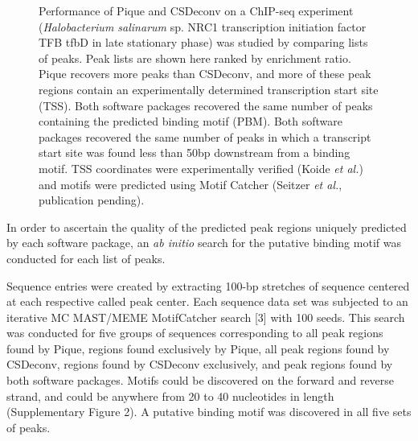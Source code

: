 \documentclass{bioinfo}
\begin{document}
\begin{figure}
  \begin{center}
    {}
  \end{center}
  \caption{Performance of Pique and CSDeconv on a ChIP-seq experiment
    ({\em Halobacterium salinarum} sp. NRC1 transcription initiation
    factor TFB tfbD in late stationary phase) was studied by comparing
    lists of peaks. Peak lists are shown here ranked by enrichment
    ratio. Pique recovers more peaks than CSDeconv, and more of these
    peak regions contain an experimentally determined transcription
    start site (TSS). Both software packages recovered the same number
    of peaks containing the predicted binding motif (PBM). Both
    software packages recovered the same number of peaks in which a
    transcript start site was found less than 50bp downstream from a
    binding motif. TSS coordinates were experimentally verified (Koide
    {\em et al.}) \cite{halo_promoters} and motifs were predicted
    using Motif Catcher (Seitzer {\em et al.}, publication
    pending).}\label{ranked_peaks}
\end{figure}

In order to ascertain the quality of the predicted peak regions
uniquely predicted by each software package, an {\em ab initio} search
for the putative binding motif was conducted for each list of peaks. 

Sequence entries were created by extracting 100-bp stretches of
sequence centered at each respective called peak center.  Each
sequence data set was subjected to an iterative MC MAST/MEME
MotifCatcher search [3] with 100 seeds. This search was conducted for
five groups of sequences corresponding to all peak regions found by
Pique, regions found exclusively by Pique, all peak regions found by
CSDeconv, regions found by CSDeconv exclusively, and peak regions
found by both software packages. Motifs could be discovered on the
forward and reverse strand, and could be anywhere from 20 to 40
nucleotides in length (Supplementary Figure 2). A putative binding
motif was discovered in all five sets of peaks.
\end{document}
